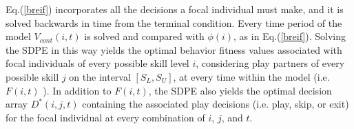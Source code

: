 \documentclass[12pt, letterpaper, fleqn]{article}
\begin{document}

      Eq.(\ref{breif}) incorporates all the decisions a focal individual must make, and it is solved backwards in time from the terminal condition.
      Every time period of the model $V_{cont}(i,t)$ is solved and compared with $\phi(i)$, as in Eq.(\ref{breif}).
      Solving the SDPE in this way yields the optimal behavior fitness values associated with focal individuals of every possible skill level $i$, considering play partners of every possible skill $j$ on the interval $[S_L,S_U]$, at every time within the model (i.e. $F(i,t)$ ).
      In addition to $F(i,t)$, the SDPE also yields the optimal decision array $D^*(i,j,t)$ containing the associated play decisions (i.e. play, skip, or exit) for the focal individual at every combination of $i$, $j$, and $t$.  


\end{document}
